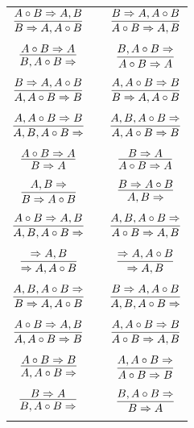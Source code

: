 \documentclass[11pt]{article}
\begin{document}
\begin{center}
\begin{tabular}{ccc}
$\infer{B\Rightarrow A, A\circ B}{A\circ B\Rightarrow A, B}$ && $\infer{A\circ B\Rightarrow A, B}{B\Rightarrow A, A\circ B}$ \\
&& \\
$\infer{B, A\circ B\Rightarrow }{A\circ B\Rightarrow A}$ && $\infer{A\circ B\Rightarrow A}{B, A\circ B\Rightarrow }$ \\
&& \\
$\infer{A, A\circ B\Rightarrow B}{B\Rightarrow A, A\circ B}$ && $\infer{B\Rightarrow A, A\circ B}{A, A\circ B\Rightarrow B}$ \\
&& \\
$\infer{A, B, A\circ B\Rightarrow }{A, A\circ B\Rightarrow B}$ && $\infer{A, A\circ B\Rightarrow B}{A, B, A\circ B\Rightarrow }$ \\
&& \\
$\infer{B\Rightarrow A}{A\circ B\Rightarrow A}$ && $\infer{A\circ B\Rightarrow A}{B\Rightarrow A}$ \\
&& \\
$\infer{B\Rightarrow A\circ B}{A, B\Rightarrow }$ && $\infer{A, B\Rightarrow }{B\Rightarrow A\circ B}$ \\
&& \\
$\infer{A, B, A\circ B\Rightarrow }{A\circ B\Rightarrow A, B}$ && $\infer{A\circ B\Rightarrow A, B}{A, B, A\circ B\Rightarrow }$ \\
&& \\
$\infer{\Rightarrow A, A\circ B}{\Rightarrow A, B}$ && $\infer{\Rightarrow A, B}{\Rightarrow A, A\circ B}$ \\
&& \\
$\infer{B\Rightarrow A, A\circ B}{A, B, A\circ B\Rightarrow }$ && $\infer{A, B, A\circ B\Rightarrow }{B\Rightarrow A, A\circ B}$ \\
&& \\
$\infer{A, A\circ B\Rightarrow B}{A\circ B\Rightarrow A, B}$ && $\infer{A\circ B\Rightarrow A, B}{A, A\circ B\Rightarrow B}$ \\
&& \\
$\infer{A, A\circ B\Rightarrow }{A\circ B\Rightarrow B}$ && $\infer{A\circ B\Rightarrow B}{A, A\circ B\Rightarrow }$ \\
&& \\
$\infer{B, A\circ B\Rightarrow }{B\Rightarrow A}$ && $\infer{B\Rightarrow A}{B, A\circ B\Rightarrow }$ \\
&& \\
\end{tabular}












\end{center}
\end{document}
